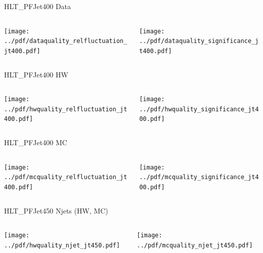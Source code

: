 \documentclass[9pt]{beamer}
\begin{document}
\begin{frame}[t]{HLT\_PFJet400 Data}
\begin{columns}[T]
  \begin{column}{.5\textwidth}
  \texttt{[image: ../pdf/dataquality\_relfluctuation\_jt400.pdf]}
  \end{column}
  \begin{column}{.5\textwidth}
  \texttt{[image: ../pdf/dataquality\_significance\_jt400.pdf]}
  \end{column}
\end{columns}
\end{frame}

\begin{frame}[t]{HLT\_PFJet400 HW}
\begin{columns}[T]
  \begin{column}{.5\textwidth}
  \texttt{[image: ../pdf/hwquality\_relfluctuation\_jt400.pdf]}
  \end{column}
  \begin{column}{.5\textwidth}
  \texttt{[image: ../pdf/hwquality\_significance\_jt400.pdf]}
  \end{column}
\end{columns}
\end{frame}

\begin{frame}[t]{HLT\_PFJet400 MC}
\begin{columns}[T]
  \begin{column}{.5\textwidth}
  \texttt{[image: ../pdf/mcquality\_relfluctuation\_jt400.pdf]}
  \end{column}
  \begin{column}{.5\textwidth}
  \texttt{[image: ../pdf/mcquality\_significance\_jt400.pdf]}
  \end{column}
\end{columns}
\end{frame}

\begin{frame}[t]{HLT\_PFJet450 Njets (HW, MC)}
\begin{columns}[T]
  \begin{column}{.5\textwidth}
  \texttt{[image: ../pdf/hwquality\_njet\_jt450.pdf]}
  \end{column}
  \begin{column}{.5\textwidth}
  \texttt{[image: ../pdf/mcquality\_njet\_jt450.pdf]}
  \end{column}
\end{columns}
\end{frame}
\end{document}
